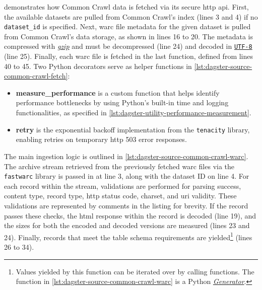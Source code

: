  demonstrates how Common Crawl data is fetched via its secure \ac{http} \ac{api}.
First, the available datasets are pulled from Common Crawl's index (lines 3 and 4) if no \texttt{dataset\_id} is specified.
Next, \ac{warc} file metadata for the given dataset is pulled from Common Crawl's data storage, as shown in lines 16 to 20.
The metadata is compressed with \href{https://www.gnu.org/software/gzip/}{\textit{gzip}} and must be decompressed (line 24) and decoded in \href{https://www.unicode.org/versions/latest/}{\texttt{UTF-8}} (line 25).
Finally, each \ac{warc} file is fetched in the last function, defined from lines 40 to 45.
Two Python decorators serve as helper functions in \cref{lst:dagster-source-common-crawl-fetch}:

\begin{itemize}
    \item \textbf{measure\_performance} is a custom function that helps identify performance bottlenecks by using Python's built-in time and logging functionalities, as specified in \cref{lst:dagster-utility-performance-measurement}.
    \item \textbf{retry} is the exponential backoff implementation from the \texttt{tenacity} library, enabling retries on temporary \ac{http} 503 error responses.
\end{itemize}

The main ingestion logic is outlined in \cref{lst:dagster-source-common-crawl-warc}.
The archive stream retrieved from the previously fetched \ac{warc} files via the \texttt{fastwarc} library is passed in at line 3, along with the dataset ID on line 4.
For each record within the stream, validations are performed for parsing success, content type, record type, \ac{http} status code, charset, and \ac{uri} validity.
These validations are represented by comments in the listing for brevity.
If the record passes these checks, the \ac{html} response within the record is decoded (line 19), and the sizes for both the encoded and decoded versions are measured (lines 23 and 24).
Finally, records that meet the table schema requirements are yielded\footnote{Values yielded by this function can be iterated over by calling functions. The function in \cref{lst:dagster-source-common-crawl-warc} is a Python \href{https://wiki.python.org/moin/Generators}{\textit{Generator}}.} (lines 26 to 34).

